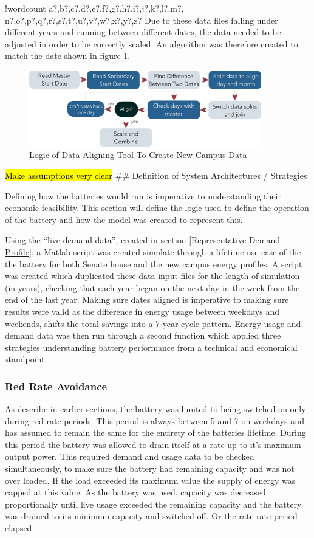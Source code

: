 \documentclass[fontsize=9.5pt]{extarticle}
\numberwithin{figure}{section} %
\newcounter{words}
\newenvironment{counted}{%
  \setcounter{words}{0}
  \SearchList!{wordcount}{\stepcounter{words}}
    {a?,b?,c?,d?,e?,f?,g?,h?,i?,j?,k?,l?,m?,
    n?,o?,p?,q?,r?,s?,t?,u?,v?,w?,x?,y?,z?}
  \UndoBoundary{'}
  \SearchOrder{p;}}{%
  \StopSearching}
\begin{document}
\begin{counted}
Due to these data files falling under different years and running
between different dates, the data needed to be adjusted in order to be
correctly scaled. An algorithm was therefore created to match the date
shown in figure \ref{Development-fc}.

\begin{figure}[H]
 \centering
 \includegraphics[trim = 0 0 0 0, clip, width=0.9\textwidth]{Development-fc.eps}
 \caption{Logic of Data Aligning Tool To Create New Campus Data}
 \label{Development-fc}
 \end{figure}

\hl{Make assumptions very clear} \#\# Definition of System Architectures
/ Strategies

Defining how the batteries would run is imperative to understanding
their economic feasibility. This section will define the logic used to
define the operation of the battery and how the model was created to
represent this.

Using the ``live demand data'', created in section
\ref{Representative-Demand-Profile}, a Matlab script was created
simulate through a lifetime use case of the the battery for both Senate
house and the new campus energy profiles. A script was created which
duplicated these data input files for the length of simulation (in
years), checking that each year began on the next day in the week from
the end of the last year. Making sure dates aligned is imperative to
making sure results were valid as the difference in energy usage between
weekdays and weekends, shifts the total savings into a 7 year cycle
pattern. Energy usage and demand data was then run through a second
function which applied three strategies understanding battery
performance from a technical and economical standpoint.

\subsubsection{Red Rate Avoidance}\label{red-rate-avoidance}

As describe in earlier sections, the battery was limited to being
switched on only during red rate periods. This period is always between
5 and 7 on weekdays and has assumed to remain the same for the entirety
of the batteries lifetime. During this period the battery was allowed to
drain itself at a rate up to it's maximum output power. This required
demand and usage data to be checked simultaneously, to make sure the
battery had remaining capacity and was not over loaded. If the load
exceeded its maximum value the supply of energy was capped at this
value. As the battery was used, capacity was decreased proportionally
until live usage exceeded the remaining capacity and the battery was
drained to its minimum capacity and switched off. Or the rate rate
period elapsed.


\end{counted}
\end{document}
